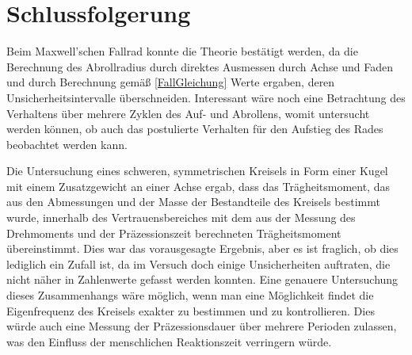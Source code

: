 \documentclass[
	a4paper,
	12pt,
	pagesize,
	ngerman
]{scrartcl}
\begin{document}
	\section{Schlussfolgerung}
	Beim Maxwell'schen Fallrad konnte die Theorie bestätigt werden, da die Berechnung des Abrollradius durch direktes Ausmessen durch Achse und Faden und durch Berechnung gemäß \cref{FallGleichung} Werte ergaben, deren Unsicherheitsintervalle überschneiden.
	Interessant wäre noch eine Betrachtung des Verhaltens über mehrere Zyklen des Auf- und Abrollens, womit untersucht werden können, ob auch das postulierte Verhalten für den Aufstieg des Rades beobachtet werden kann. %
	\par
	Die Untersuchung eines schweren, symmetrischen Kreisels in Form einer Kugel mit einem Zusatzgewicht an einer Achse ergab, dass das Trägheitsmoment, das aus den Abmessungen und der Masse der Bestandteile des Kreisels bestimmt wurde, innerhalb des Vertrauensbereiches mit dem aus der Messung des Drehmoments und der Präzessionszeit berechneten Trägheitsmoment übereinstimmt.
	Dies war das vorausgesagte Ergebnis, aber es ist fraglich, ob dies lediglich ein Zufall ist, da im Versuch doch einige Unsicherheiten auftraten, die nicht näher in Zahlenwerte gefasst werden konnten.
	Eine genauere Untersuchung dieses Zusammenhangs wäre möglich, wenn man eine Möglichkeit findet die Eigenfrequenz des Kreisels exakter zu bestimmen und zu kontrollieren.
	Dies würde auch eine Messung der Präzessionsdauer über mehrere Perioden zulassen, was den Einfluss der menschlichen Reaktionszeit verringern würde.
\end{document}
